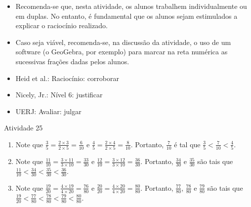 \begin{multicols}{2}
  
 
\begin{itemize} %
    \item       Recomenda-se que, nesta atividade, os alunos trabalhem 
individualmente ou em duplas. No entanto, é fundamental que os alunos sejam 
estimulados a explicar o raciocínio realizado.
    \item       Caso seja viável, recomenda-se, na discussão da atividade, o uso 
de um software (o GeoGebra, por exemplo) para marcar na reta numérica as 
sucessivas frações dadas pelos alunos. 
\end{itemize} %
  
  
   \vspace{.1cm}
  
 \vspace{.1cm}
   
\begin{itemize} %
    \item       Heid et al.: Raciocínio: corroborar
    \item       Nicely, Jr.: Nível 6: justificar
    \item       UERJ: Avaliar: julgar
\end{itemize} %

\begin{resposta*}{Atividade 25}  
\begin{enumerate} [\quad a)] %
    \item       Note que       $\frac{3}{5} = \frac{2 \times 3}{2 \times 5} = 
\frac{6}{10}$       e       $\frac{4}{5} = \frac{2 \times 4}{2 \times 5} = 
\frac{8}{10}$. Portanto,       $\frac{7}{10}$       é tal que       $\frac{3}{5} 
< \frac{7}{10} < \frac{4}{5}$.
    \item       Note que       $\frac{11}{10} = \frac{3 \times 11}{3 \times 10} 
= \frac{33}{30}$       e       $\frac{12}{10} = \frac{3 \times 12}{3 \times 10} 
= \frac{36}{30}$. Portanto,       $\frac{34}{30}$       e       $\frac{35}{30}$  
     são tais que       $\frac{11}{10} < \frac{34}{30} < \frac{35}{30} < 
\frac{36}{30}$.
    \item       Note que       $\frac{19}{20} = \frac{4 \times 19}{4 \times 20} 
= \frac{76}{80}$       e       $\frac{20}{20} = \frac{4 \times 20}{4 \times 20} 
= \frac{80}{80}$. Portanto,       $\frac{77}{80}$,       $\frac{78}{80}$       e 
      $\frac{79}{80}$       são tais que       $\frac{19}{20} < \frac{77}{80} < 
\frac{78}{80} < \frac{79}{80} < \frac{80}{80}$.
\end{enumerate} %
  
\end{resposta*}
\Bg
\Bg


\end{multicols}
